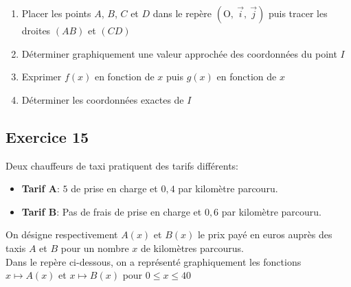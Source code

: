 \documentclass[12pt,a4paper]{article}
\def\Oij{$\left(\text{O},~\vec{i},~\vec{j}\right)$}
\begin{document}
\begin{enumerate}
    \item Placer les points $A$, $B$, $C$ et $D$ dans le repère \Oij{} puis tracer les droites $(AB)$ et $(CD)$
    \item Déterminer graphiquement une valeur approchée des coordonnées du point $I$
    \item Exprimer $f(x)$ en fonction de $x$ puis $g(x)$ en fonction de $x$
    \item Déterminer les coordonnées exactes de $I$
\end{enumerate}

\subsection*{Exercice 15}

Deux chauffeurs de taxi pratiquent des tarifs  différents:

\begin{itemize}
    \item \textbf{Tarif A}: $5$ \EUR{} de prise en charge et $0,4$ \EUR{} par kilomètre parcouru.
    \item  \textbf{Tarif B}: Pas de frais de prise en charge et $0,6$ \EUR{} par kilomètre parcouru.
\end{itemize}

On désigne respectivement $A(x)$ et $ B(x)$ le prix payé en euros auprès des taxis $A$ et $B$ pour un nombre $x$ de kilomètres parcourus. \\
Dans le repère ci-dessous, on a représenté graphiquement les fonctions $x\mapsto A(x)$ et $x\mapsto B(x)$ pour $0\leq x\leq 40$



\begin{center}
\end{center}
\end{document}
